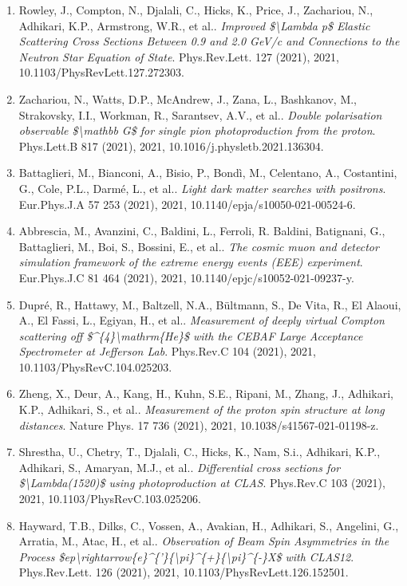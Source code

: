 \begin{enumerate}
\item Rowley, J., Compton, N., Djalali, C., Hicks, K., Price, J., Zachariou, N., Adhikari, K.P., Armstrong, W.R., et al.. \textit{Improved \$\textbackslash{}Lambda p\$ Elastic Scattering Cross Sections Between 0.9 and 2.0 GeV/c and Connections to the Neutron Star Equation of State}. Phys.Rev.Lett. 127 (2021), 2021, 10.1103/PhysRevLett.127.272303.
\item Zachariou, N., Watts, D.P., McAndrew, J., Zana, L., Bashkanov, M., Strakovsky, I.I., Workman, R., Sarantsev, A.V., et al.. \textit{Double polarisation observable \$\textbackslash{}mathbb G\$ for single pion photoproduction from the proton}. Phys.Lett.B 817 (2021), 2021, 10.1016/j.physletb.2021.136304.
\item Battaglieri, M., Bianconi, A., Bisio, P., Bondì, M., Celentano, A., Costantini, G., Cole, P.L., Darmé, L., et al.. \textit{Light dark matter searches with positrons}. Eur.Phys.J.A 57 253 (2021), 2021, 10.1140/epja/s10050-021-00524-6.
\item Abbrescia, M., Avanzini, C., Baldini, L., Ferroli, R. Baldini, Batignani, G., Battaglieri, M., Boi, S., Bossini, E., et al.. \textit{The cosmic muon and detector simulation framework of the extreme energy events (EEE) experiment}. Eur.Phys.J.C 81 464 (2021), 2021, 10.1140/epjc/s10052-021-09237-y.
\item Dupré, R., Hattawy, M., Baltzell, N.A., Bültmann, S., De Vita, R., El Alaoui, A., El Fassi, L., Egiyan, H., et al.. \textit{Measurement of deeply virtual Compton scattering off \$\textasciicircum{}\{4\}\textbackslash{}mathrm\{He\}\$ with the CEBAF Large Acceptance Spectrometer at Jefferson Lab}. Phys.Rev.C 104 (2021), 2021, 10.1103/PhysRevC.104.025203.
\item Zheng, X., Deur, A., Kang, H., Kuhn, S.E., Ripani, M., Zhang, J., Adhikari, K.P., Adhikari, S., et al.. \textit{Measurement of the proton spin structure at long distances}. Nature Phys. 17 736 (2021), 2021, 10.1038/s41567-021-01198-z.
\item Shrestha, U., Chetry, T., Djalali, C., Hicks, K., Nam, S.i., Adhikari, K.P., Adhikari, S., Amaryan, M.J., et al.. \textit{Differential cross sections for \$\textbackslash{}Lambda(1520)\$ using photoproduction at CLAS}. Phys.Rev.C 103 (2021), 2021, 10.1103/PhysRevC.103.025206.
\item Hayward, T.B., Dilks, C., Vossen, A., Avakian, H., Adhikari, S., Angelini, G., Arratia, M., Atac, H., et al.. \textit{Observation of Beam Spin Asymmetries in the Process \$ep\textbackslash{}rightarrow\{e\}\textasciicircum{}\{'\}\{\textbackslash{}pi\}\textasciicircum{}\{+\}\{\textbackslash{}pi\}\textasciicircum{}\{-\}X\$ with CLAS12}. Phys.Rev.Lett. 126 (2021), 2021, 10.1103/PhysRevLett.126.152501.

\end{enumerate}

